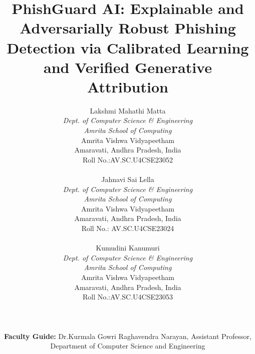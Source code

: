 \documentclass[conference]{IEEEtran}
\begin{document}
\title{PhishGuard AI: Explainable and Adversarially Robust Phishing Detection via Calibrated Learning and Verified Generative Attribution}

\author{%
\begin{minipage}[t]{0.32\textwidth}
\centering
{\normalsize Lakshmi Mahathi Matta}\\[2pt]
{\small\itshape Dept. of Computer Science \& Engineering}\\
{\small\itshape Amrita School of Computing}\\
{\small Amrita Vishwa Vidyapeetham}\\
{\small Amaravati, Andhra Pradesh, India}\\
{\small Roll No.:AV.SC.U4CSE23052}\\

\end{minipage}\hfill
\begin{minipage}[t]{0.32\textwidth}
\centering
{\normalsize Jahnavi Sai Lella}\\[2pt]
{\small\itshape Dept. of Computer Science \& Engineering}\\
{\small\itshape Amrita School of Computing}\\
{\small Amrita Vishwa Vidyapeetham}\\
{\small Amaravati, Andhra Pradesh, India}\\
{\small Roll No.: AV.SC.U4CSE23024}\\

\end{minipage}\hfill
\begin{minipage}[t]{0.32\textwidth}
\centering
{\normalsize Kumudini Kanumuri}\\[2pt]
{\small\itshape Dept. of Computer Science \& Engineering}\\
{\small\itshape Amrita School of Computing}\\
{\small Amrita Vishwa Vidyapeetham}\\
{\small Amaravati, Andhra Pradesh, India}\\
{\small Roll No.:AV.SC.U4CSE23053}\\

\end{minipage}\\[14pt]
\begin{minipage}[t]{0.95\textwidth}
\centering
{\small\textbf{Faculty Guide:} Dr.Kurmala Gowri Raghavendra Narayan, Assistant Professor, Department of Computer Science and Engineering}\\

\end{minipage}
}
\end{document}
